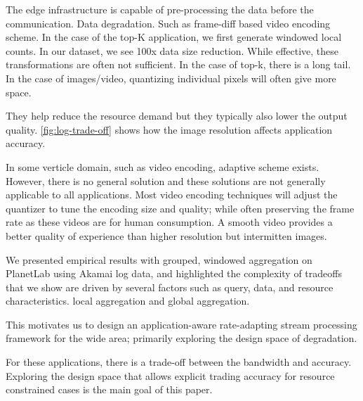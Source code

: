 

The edge infrastructure is capable of pre-processing the data before the
communication. Data degradation. Such as frame-diff based video encoding
scheme. In the case of the top-K application, we first generate windowed local
counts. In our dataset, we see 100x data size reduction. While effective, these
transformations are often not sufficient. In the case of top-k, there is a long
tail. In the case of images/video, quantizing individual pixels will often give
more space.

They help reduce the resource demand but they typically also lower the output
quality. \autoref{fig:log-trade-off} shows how the image resolution affects
application accuracy.

In some verticle domain, such as video encoding, adaptive scheme
exists. However, there is no general solution and these solutions are not
generally applicable to all applications. Most video encoding techniques will
adjust the quantizer to tune the encoding size and quality; while often
preserving the frame rate as these videos are for human consumption. A smooth
video provides a better quality of experience than higher resolution but
intermitten images.

We presented empirical results with grouped, windowed aggregation on PlanetLab
using Akamai log data, and highlighted the complexity of tradeoffs that we show
are driven by several factors such as query, data, and resource
characteristics. local aggregation and global
aggregation.~\cite{heintz2015towards}

This motivates us to design an application-aware rate-adapting stream processing
framework for the wide area; primarily exploring the design space of
degradation.

For these applications, there is a trade-off between the bandwidth and accuracy.
Exploring the design space that allows explicit trading accuracy for resource
constrained cases is the main goal of this paper.


